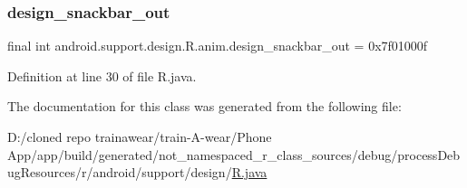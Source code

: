 \subsubsection{\texorpdfstring{design\_snackbar\_out}{design\_snackbar\_out}}
{\footnotesize\ttfamily final int android.\+support.\+design.\+R.\+anim.\+design\+\_\+snackbar\+\_\+out = 0x7f01000f\hspace{0.3cm}{\ttfamily [static]}}



Definition at line 30 of file R.\+java.



The documentation for this class was generated from the following file\+:\begin{DoxyCompactItemize}
\item 
D\+:/cloned repo trainawear/train-\/\+A-\/wear/\+Phone App/app/build/generated/not\+\_\+namespaced\+\_\+r\+\_\+class\+\_\+sources/debug/process\+Debug\+Resources/r/android/support/design/\mbox{\hyperlink{process_debug_resources_2r_2android_2support_2design_2_r_8java}{R.\+java}}\end{DoxyCompactItemize}
